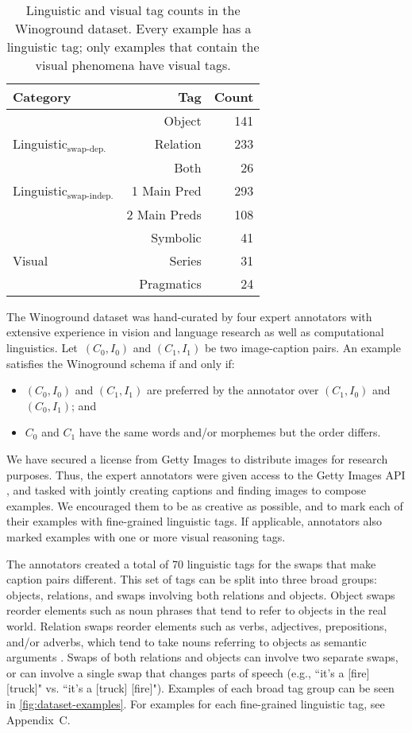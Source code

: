 \documentclass[10pt,twocolumn,letterpaper]{article}
\begin{document}
\begin{table}
\centering
\begin{tabular}{lrr}
\toprule
 Category & Tag    &   Count \\
\midrule
& Object   &     141 \\
 Linguistic$_\text{swap-dep.}$ & Relation &     233 \\
 & Both &      26 \\\midrule
 Linguistic$_\text{swap-indep.}$ & 1 Main Pred & 293 \\
 & 2 Main Preds & 108 \\\midrule
 & Symbolic &  41 \\
 Visual & Series &  31 \\
 & Pragmatics &  24\\
\bottomrule
\end{tabular}
\caption{Linguistic and visual tag counts in the Winoground dataset. Every example has a linguistic tag; only examples that contain the visual phenomena have visual tags.}
\label{tab:stats-tag-subset}
\end{table}


The Winoground dataset was hand-curated by four expert annotators with extensive experience in vision and language research as well as computational linguistics. Let~$(C_{0},I_{0})$ and $(C_{1},I_{1})$ be two image-caption pairs. An example satisfies the Winoground schema if and only if:
\begin{itemize}
    \item $(C_{0},I_{0})$ and $(C_{1},I_{1})$ are preferred by the annotator over $(C_{1},I_{0})$ and $(C_{0},I_{1})$; and
    \item $C_{0}$ and $C_{1}$ have the same words and/or morphemes but the order differs.
\end{itemize}

We have secured a license from Getty Images to distribute images for research purposes. Thus, the expert annotators were given access to the Getty Images API \cite{getty}, and tasked with jointly creating captions and finding images to compose examples. We encouraged them to be as creative as possible, and to mark each of their examples with fine-grained linguistic tags. If applicable, annotators also marked examples with one or more visual reasoning tags.

The annotators created a total of 70 linguistic tags for the swaps that make caption pairs different. This set of tags can be split into three broad groups: objects, relations, and swaps involving both relations and objects. Object swaps reorder elements such as noun phrases that tend to refer to objects in the real world. Relation swaps reorder elements such as verbs, adjectives, prepositions, and/or adverbs, which tend to take nouns referring to objects as semantic arguments \cite{altshuler2019course}. Swaps of both relations and objects can involve two separate swaps, or can involve a single swap that changes parts of speech (e.g., ``it's a [fire] [truck]" vs. ``it's a [truck] [fire]"). Examples of each broad tag group can be seen in \cref{fig:dataset-examples}. For examples for each fine-grained linguistic tag, see Appendix~C.
\end{document}
